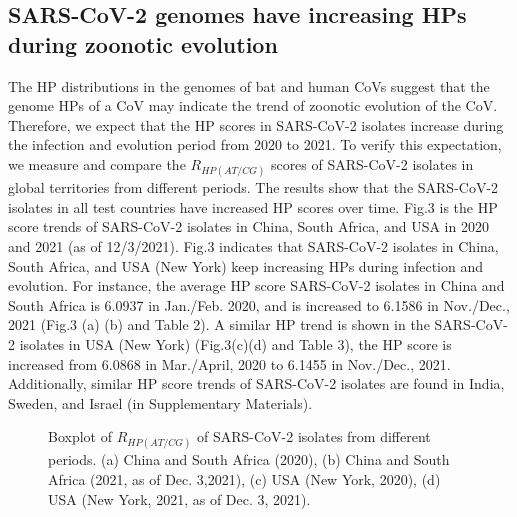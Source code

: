 \documentclass{article}
\numberwithin{equation}{section}
\begin{document}
\subsection{SARS-CoV-2 genomes have increasing HPs during zoonotic evolution}
The HP distributions in the genomes of bat and human CoVs suggest that the genome HPs of a CoV may indicate the trend of zoonotic evolution of the CoV. Therefore, we expect that the HP scores in SARS-CoV-2 isolates increase during the infection and evolution period from 2020 to 2021. To verify this expectation, we measure and compare the $R_{HP(AT/CG)}$ scores of SARS-CoV-2 isolates in global territories from different periods. The results show that the SARS-CoV-2 isolates in all test countries have increased HP scores over time. Fig.3 is the HP score trends of SARS-CoV-2 isolates in China, South Africa, and USA in 2020 and 2021 (as of 12/3/2021). Fig.3 indicates that SARS-CoV-2 isolates in China, South Africa, and USA (New York) keep increasing HPs during infection and evolution. For instance, the average HP score SARS-CoV-2 isolates in China and South Africa is 6.0937 in Jan./Feb. 2020, and is increased to 6.1586 in Nov./Dec., 2021 (Fig.3 (a) (b) and Table 2). A similar HP trend is shown in the SARS-CoV-2 isolates in USA (New York) (Fig.3(c)(d) and Table 3), the HP score is increased from 6.0868 in Mar./April, 2020 to 6.1455 in Nov./Dec., 2021. Additionally, similar HP score trends of SARS-CoV-2 isolates are found in India, Sweden, and Israel (in Supplementary Materials). 

\begin{figure}[tbp]
	\centering
	\quad
	\quad
	\caption{Boxplot of $R_{HP(AT/CG)}$ of SARS-CoV-2 isolates from different periods. (a) China and South Africa (2020), (b) China and South Africa (2021, as of Dec. 3,2021), (c) USA (New York, 2020), (d) USA (New York, 2021, as of Dec. 3, 2021).}
	\label{fig:sub1}
\end{figure}
\end{document}

